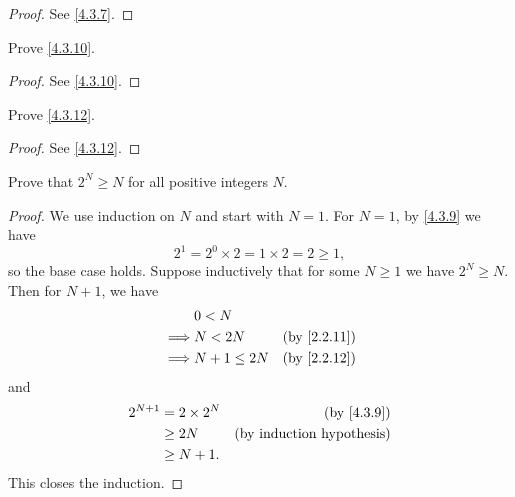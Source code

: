 \begin{proof}
  See \cref{4.3.7}.
\end{proof}

\begin{exercise}\label{ex 4.3.3}
  Prove \cref{4.3.10}.
\end{exercise}

\begin{proof}
  See \cref{4.3.10}.
\end{proof}

\begin{exercise}
  Prove \cref{4.3.12}.
\end{exercise}

\begin{proof}
  See \cref{4.3.12}.
\end{proof}

\begin{exercise}\label{ex 4.3.5}
  Prove that \(2^N \geq N\) for all positive integers \(N\).
\end{exercise}

\begin{proof}
  We use induction on \(N\) and start with \(N = 1\).
  For \(N = 1\), by \cref{4.3.9} we have
  \[
    2^1 = 2^0 \times 2 = 1 \times 2 = 2 \geq 1,
  \]
  so the base case holds.
  Suppose inductively that for some \(N \geq 1\) we have \(2^N \geq N\).
  Then for \(N + 1\), we have
  \begin{align*}
             & 0 < N                                     \\
    \implies & N < 2N        & \text{(by \cref{2.2.11})} \\
    \implies & N + 1 \leq 2N & \text{(by \cref{2.2.12})}
  \end{align*}
  and
  \begin{align*}
    2^{N + 1} & = 2 \times 2^N & \text{(by \cref{4.3.9})}         \\
              & \geq 2N        & \text{(by induction hypothesis)} \\
              & \geq N + 1.
  \end{align*}
  This closes the induction.
\end{proof}